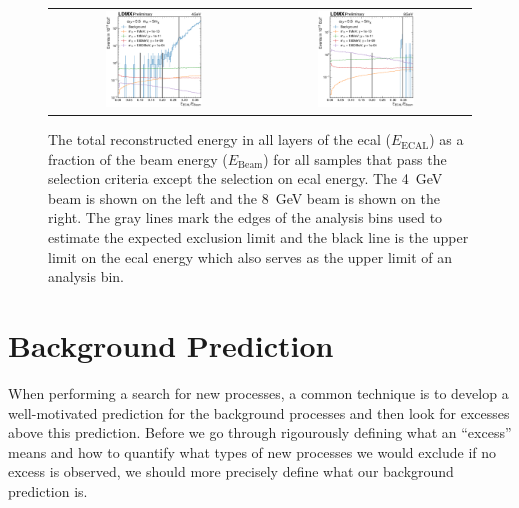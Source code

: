 \begin{figure}[htb]
    \centering
    \begin{tabular}{cc}
       \includegraphics[width=0.48\textwidth]{figures/ldmx/analysis/final-selection-with-ana-bin-edges-4gev.pdf}
       &
       \includegraphics[width=0.48\textwidth]{figures/ldmx/analysis/final-selection-with-ana-bin-edges-8gev.pdf}
    \end{tabular}
    \centering
    \caption{The total reconstructed energy in all layers of the \ac{ecal} ($E_\text{ECAL}$)
    as a fraction of the beam energy ($E_\text{Beam}$) for all samples that
    pass the selection criteria except the selection on \ac{ecal} energy.
    The \qty{4}{\GeV} beam is shown on the left and the \qty{8}{\GeV} beam is shown on the right.
    The gray lines mark the edges of the analysis bins used to
    estimate the expected exclusion limit and the black line is the upper limit
    on the \ac{ecal} energy which also serves as the upper limit of an analysis bin.
    }
    \label{fig:final-selection}
\end{figure}

\section{Background Prediction}
When performing a search for new processes, a common technique is to develop a well-motivated
prediction for the background processes and then look for excesses above this prediction.
Before we go through rigourously defining what an ``excess'' means and how to quantify
what types of new processes we would exclude if no excess is observed,
we should more precisely define what our background prediction is.

